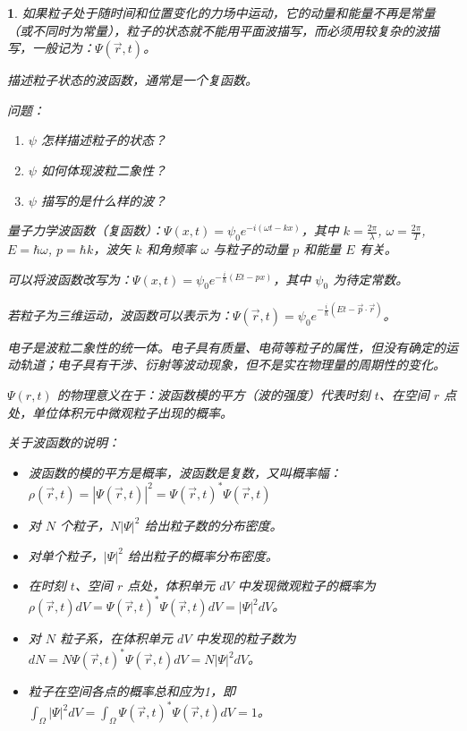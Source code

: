 \documentclass[UTF8]{report}
\theoremstyle{MyLineTheoremStyle} %
\theoremstyle{MyBlockTheoremStyle} %
\theoremstyle{MySubsubsectionStyle} %
\newtheorem{definition}{}
\begin{document}
\begin{definition}
    如果粒子处于随时间和位置变化的力场中运动，它的动量和能量不再是常量（或不同时为常量），粒子的状态就不能用平面波描写，而必须用较复杂的波描写，一般记为：$\varPsi(\overrightarrow{r},t)$。

    描述粒子状态的波函数，通常是一个复函数。

    问题：
    \begin{enumerate}
        \item \(\psi\) 怎样描述粒子的状态？
        \item \(\psi\) 如何体现波粒二象性？
        \item \(\psi\) 描写的是什么样的波？
    \end{enumerate}

    量子力学波函数（复函数）：$\Psi (x,t) = \psi_0 e^{-i\left(\omega t - kx\right)}$，其中 \(k = \frac{2\pi}{\lambda}\), \(\omega = \frac{2\pi}{T}\), \(E = \hbar \omega\), \(p = \hbar k\)，波矢 \(k\) 和角频率 \(\omega\) 与粒子的动量 \(p\) 和能量 \(E\) 有关。

    可以将波函数改写为：$\Psi (x,t) = \psi_0 e^{-\frac{i}{\hbar}\left(Et - px\right)}$，其中 $\psi_0$ 为待定常数。

    若粒子为三维运动，波函数可以表示为：$\Psi (\overrightarrow{r},t) = \psi_0 e^{-\frac{i}{\hbar}\left(Et - \overrightarrow{p} \cdot \overrightarrow{r}\right)}$。

    电子是波粒二象性的统一体。电子具有质量、电荷等粒子的属性，但没有确定的运动轨道；电子具有干涉、衍射等波动现象，但不是实在物理量的周期性的变化。

    $\Psi (r,t)$ 的物理意义在于：波函数模的平方（波的强度）代表时刻 \(t\)、在空间 \(r\) 点处，单位体积元中微观粒子出现的概率。

    关于波函数的说明：
    \begin{itemize}
        \item 波函数的模的平方是概率，波函数是复数，又叫概率幅：$\rho (\overrightarrow{r},t) = |\Psi (\overrightarrow{r},t)|^2 = \Psi (\overrightarrow{r},t)^* \Psi (\overrightarrow{r},t)$
        \item 对 \(N\) 个粒子，\(N|\Psi|^2\) 给出粒子数的分布密度。
        \item 对单个粒子，\(|\Psi|^2\) 给出粒子的概率分布密度。
        \item 在时刻 \(t\)、空间 \(r\) 点处，体积单元 \(dV\) 中发现微观粒子的概率为 \(\rho (\overrightarrow{r},t)dV = \Psi (\overrightarrow{r},t)^* \Psi (\overrightarrow{r},t)dV = |\Psi|^2 dV\)。
        \item 对 \(N\) 粒子系，在体积单元 \(dV\) 中发现的粒子数为 \(dN = N\Psi (\overrightarrow{r},t)^* \Psi (\overrightarrow{r},t)dV = N|\Psi|^2 dV\)。
        \item 粒子在空间各点的概率总和应为1，即 \(\int_{\Omega} |\Psi|^2 dV = \int_{\Omega}\Psi (\overrightarrow{r},t)^* \Psi (\overrightarrow{r},t)dV = 1\)。
    \end{itemize}


\end{definition}
\end{document}
